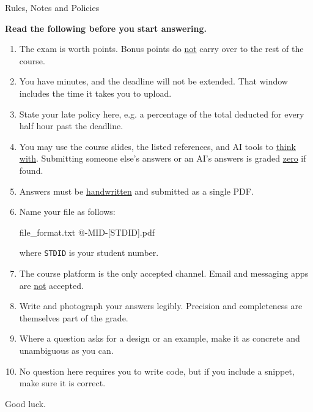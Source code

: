 \begin{neobox}[neotitlefont=\pixelfont]{Rules, Notes and Policies}

    \vspace{5mm}
    \begin{center}
        {\large \textbf{Read the following before you start answering.}}
    \end{center}
    \vspace{5mm}

    \begin{enumerate}
        \item The exam is worth \examgrade{} points. Bonus points do
              \underline{not} carry over to the rest of the course.

        \item You have \examtime{} minutes, and the deadline will not be
              extended. That window includes the time it takes you to upload.

        \item State your late policy here, e.g. a percentage of the total
              deducted for every half hour past the deadline.

        \item You may use the course slides, the listed references, and AI
              tools to \underline{think with}. Submitting someone else's
              answers or an AI's answers is graded \underline{zero} if found.

        \item Answers must be \underline{handwritten} and submitted as a
              single PDF.

        \item Name your file as follows:

              \begin{neocode}[neocodetitlefont=\small\pixelfont]{file\_format.txt}
@\coursecode@-MID-[STDID].pdf
              \end{neocode}

              where \texttt{STDID} is your student number.

        \item The course platform is the only accepted channel. Email and
              messaging apps are \underline{not} accepted.

        \item Write and photograph your answers legibly. Precision and
              completeness are themselves part of the grade.

        \item Where a question asks for a design or an example, make it as
              concrete and unambiguous as you can.

        \item No question here requires you to write code, but if you include
              a snippet, make sure it is correct.
    \end{enumerate}

    \vspace{5mm}

    Good luck.

\end{neobox}
